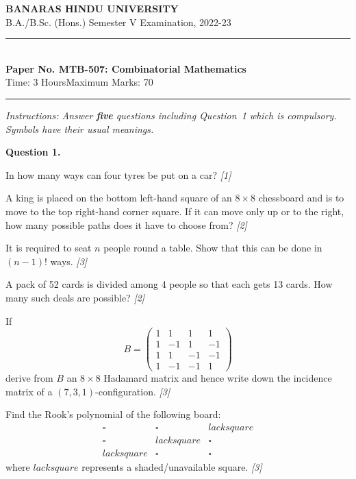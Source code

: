 \documentclass[11pt,a4paper]{article}
\newcommand{\pts}[1]{\hfill   \textit{[#1]}}
\begin{document}
\begin{center}
  {\large\bfseries BANARAS HINDU UNIVERSITY}\\[2pt]
  {\normalsize B.A./B.Sc. (Hons.) Semester V Examination, 2022-23}\\[6pt]
  \rule{0.8\linewidth}{0.5pt}\\[6pt]
  {\large\bfseries Paper No. MTB-507: Combinatorial Mathematics}\\[4pt]
  {\normalsize Time: 3 Hours\hfill Maximum Marks: 70}
\end{center}

\rule{\linewidth}{0.4pt}

\smallskip



\noindent   \textit{Instructions: Answer   \textbf{five} questions including Question~1 which is compulsory. Symbols have their usual meanings.}

\medskip


\noindent   \textbf{Question 1.}

\begin{parts}
  \item In how many ways can four tyres be put on a car? \pts{1}
  \item A king is placed on the bottom left-hand square of an $8  \times 8$ chessboard and is to move to the top right-hand corner square. If it can move only up or to the right, how many possible paths does it have to choose from? \pts{2}
  \item It is required to seat $n$ people round a table. Show that this can be done in $(n-1)!$ ways. \pts{3}
  \item A pack of 52 cards is divided among 4 people so that each gets 13 cards. How many such deals are possible? \pts{2}
  \item If
  \[ B = 
\begin{pmatrix} 1 & 1 & 1 & 1 \\ 1 & -1 & 1 & -1 \\ 1 & 1 & -1 & -1 \\ 1 & -1 & -1 & 1 \end{pmatrix} \]
  derive from $B$ an $8  \times 8$ Hadamard matrix and hence write down the incidence matrix of a $(7,3,1)$-configuration. \pts{3}
  \item Find the Rook's polynomial of the following board:
  \[ 
\begin{array}{ccc}
  \square & \square & lacksquare \\
  \square & lacksquare & \square \\
  lacksquare & \square & \square
  \end{array} \]
  where $lacksquare$ represents a shaded/unavailable square. \pts{3}
\end{parts}
\end{document}
